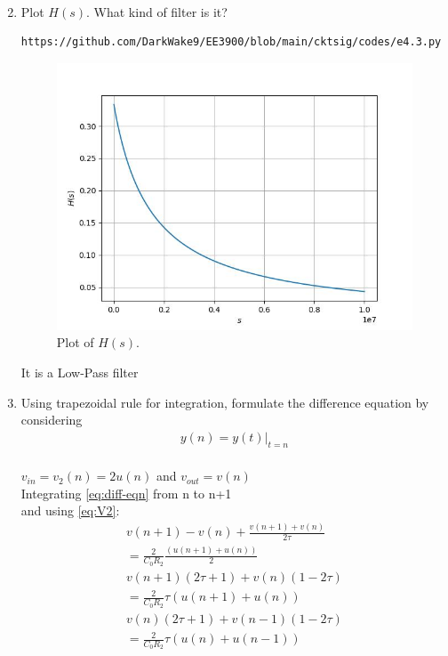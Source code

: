 \documentclass[journal,12pt,twocolumn]{IEEEtran}
\renewcommand\thesection{\arabic{section}}
\begin{document}
\begin{enumerate}[label=\arabic*.,ref=\thesection.\theenumi]
\begin{align}
	\label{eq:Hs}
\end{align}
\item Plot $H(s)$.  What kind of filter is it?\\
\begin{lstlisting}
https://github.com/DarkWake9/EE3900/blob/main/cktsig/codes/e4.3.py
\end{lstlisting}
\begin{figure}[!ht]
	\includegraphics[width=\columnwidth]{./figs/e4.3.jpg}
	\caption{Plot of $H(s)$.}
	\label{fig:Hs}
\end{figure}
It is a Low-Pass filter\\
\item Using trapezoidal rule for integration, formulate the difference equation
by considering 
\begin{align}
	y(n) = y(t)\vert_{t=n}
\end{align}
\solution\\
$v_{in} = v_2(n) = 2u(n)$ and $v_{out} = v(n)$\\
Integrating \eqref{eq:diff-eqn} from n to n+1\\ and using \eqref{eq:V2}:
\begin{align}
	v(n+1) - v(n) + \frac{v(n+1) + v(n)}{2\tau} \nonumber\\ = \frac{2}{C_0R_2}\frac{(u(n+1) + u(n))}{2}\\
	v(n+1)(2\tau + 1) + v(n)(1 - 2\tau) \nonumber \\ = \frac{2}{C_0R_2}\tau(u(n+1) + u(n))\\
	v(n)(2\tau + 1) + v(n-1)(1 - 2\tau) \nonumber \\ = \frac{2}{C_0R_2}\tau(u(n) + u(n-1))

\end{align}
\end{enumerate}
\end{document}
